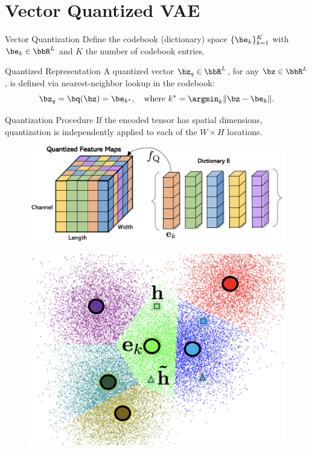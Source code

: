\documentclass{beamer}
\begin{document}
\section{Vector Quantized VAE}
\begin{frame}{Vector Quantization}
	Define the codebook (dictionary) space $\{\be_k\}_{k=1}^K$ with $\be_k \in \bbR^L$ and $K$ the number of codebook entries.
    \eqpause
	\begin{block}{Quantized Representation}
		A quantized vector $\bz_q \in \bbR^{L}$, for any $\bz \in \bbR^L$, is defined via nearest-neighbor lookup in the codebook:
		\vspace{-0.3cm}
		\[
			\bz_q = \bq (\bz) = \be_{k^*}, \quad \text{where } k^* = \argmin_k \| \bz - \be_k \|.
		\] 
		\vspace{-0.7cm}
	\end{block}
	\eqpause
	\vspace{-0.2cm}
	\begin{block}{Quantization Procedure}
		If the encoded tensor has spatial dimensions, quantization is independently applied to each of the $W \times H$ locations.
		\begin{minipage}[t]{0.65\columnwidth}
			\begin{figure}
				\includegraphics[width=0.8\linewidth]{figs/fqgan_cnn.png}
			\end{figure}
		\end{minipage}%
		\begin{minipage}[t]{0.35\columnwidth}
			\begin{figure}
				\includegraphics[width=0.7\linewidth]{figs/fqgan_lookup}
			\end{figure}
		\end{minipage}
	\end{block}
\end{frame}
\end{document}
